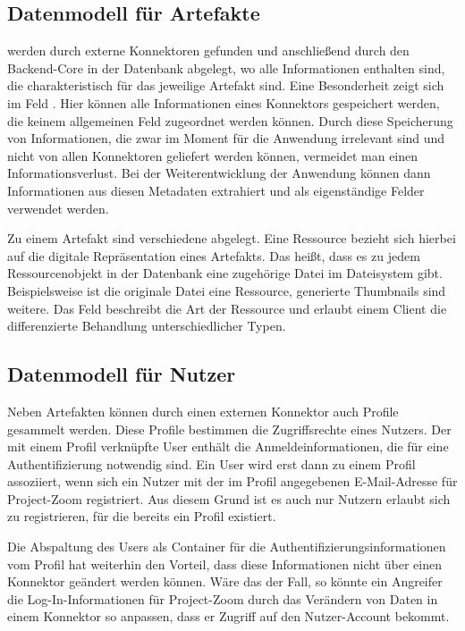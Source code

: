 \subsection{Datenmodell für \gls{Artefakt}e}

 werden durch externe Konnektoren gefunden und anschließend durch den \gls{Backend}-Core in der Datenbank abgelegt, wo alle Informationen enthalten sind, die charakteristisch für das jeweilige \gls{Artefakt} sind. Eine Besonderheit zeigt sich im Feld . Hier können alle Informationen eines Konnektors gespeichert werden, die keinem allgemeinen Feld zugeordnet werden können. Durch diese Speicherung von Informationen, die zwar im Moment für die Anwendung irrelevant sind und nicht von allen Konnektoren geliefert werden können, vermeidet man einen Informationsverlust. Bei der Weiterentwicklung der Anwendung können dann Informationen aus diesen Metadaten extrahiert und als eigenständige Felder verwendet werden. 

Zu einem \gls{Artefakt} sind verschiedene  abgelegt. Eine \gls{Ressource} bezieht sich hierbei auf die digitale Repräsentation eines \gls{Artefakt}s. Das heißt, dass es zu jedem \gls{Ressource}nobjekt in der Datenbank eine zugehörige Datei im Dateisystem gibt. Beispielsweise ist die originale Datei eine \gls{Ressource}, generierte \gls{Thumbnail}s sind weitere. Das Feld  beschreibt die Art der \gls{Ressource} und erlaubt einem Client die differenzierte Behandlung unterschiedlicher Typen.  

\subsection{Datenmodell für Nutzer}

Neben \gls{Artefakt}en können durch einen externen Konnektor auch Profile gesammelt werden. Diese Profile bestimmen die Zugriffsrechte eines Nutzers. Der mit einem Profil verknüpfte User enthält die Anmeldeinformationen, die für eine Authentifizierung notwendig sind. Ein User wird erst dann zu einem Profil assoziiert, wenn sich ein Nutzer mit der im Profil angegebenen E-Mail-Adresse für Project-Zoom registriert. Aus diesem Grund ist es auch nur Nutzern erlaubt sich zu registrieren, für die bereits ein Profil existiert.

Die Abspaltung des Users als Container für die Authentifizierungsinformationen vom Profil hat weiterhin den Vorteil, dass diese Informationen nicht über einen Konnektor geändert werden können. Wäre das der Fall, so könnte ein Angreifer die Log-In-Informationen für Project-Zoom durch das Verändern von Daten in einem Konnektor so anpassen, dass er Zugriff auf den Nutzer-Account bekommt.


